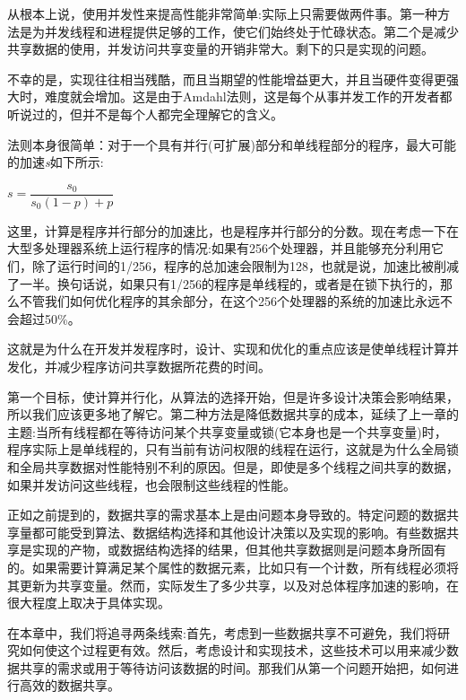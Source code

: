 从根本上说，使用并发性来提高性能非常简单:实际上只需要做两件事。第一种方法是为并发线程和进程提供足够的工作，使它们始终处于忙碌状态。第二个是减少共享数据的使用，并发访问共享变量的开销非常大。剩下的只是实现的问题。

不幸的是，实现往往相当残酷，而且当期望的性能增益更大，并且当硬件变得更强大时，难度就会增加。这是由于Amdahl法则，这是每个从事并发工作的开发者都听说过的，但并不是每个人都完全理解它的含义。

法则本身很简单：对于一个具有并行(可扩展)部分和单线程部分的程序，最大可能的加速\textit{s}如下所示:

\begin{center}
$ s = \dfrac{s_0}{s_0(1-p)+p} $
\end{center}

这里，计算是程序并行部分的加速比，也是程序并行部分的分数。现在考虑一下在大型多处理器系统上运行程序的情况:如果有256个处理器，并且能够充分利用它们，除了运行时间的1/256，程序的总加速会限制为128，也就是说，加速比被削减了一半。换句话说，如果只有1/256的程序是单线程的，或者是在锁下执行的，那么不管我们如何优化程序的其余部分，在这个256个处理器的系统的加速比永远不会超过50\%。

这就是为什么在开发并发程序时，设计、实现和优化的重点应该是使单线程计算并发化，并减少程序访问共享数据所花费的时间。

第一个目标，使计算并行化，从算法的选择开始，但是许多设计决策会影响结果，所以我们应该更多地了解它。第二种方法是降低数据共享的成本，延续了上一章的主题:当所有线程都在等待访问某个共享变量或锁(它本身也是一个共享变量)时，程序实际上是单线程的，只有当前有访问权限的线程在运行，这就是为什么全局锁和全局共享数据对性能特别不利的原因。但是，即使是多个线程之间共享的数据，如果并发访问这些线程，也会限制这些线程的性能。

正如之前提到的，数据共享的需求基本上是由问题本身导致的。特定问题的数据共享量都可能受到算法、数据结构选择和其他设计决策以及实现的影响。有些数据共享是实现的产物，或数据结构选择的结果，但其他共享数据则是问题本身所固有的。如果需要计算满足某个属性的数据元素，比如只有一个计数，所有线程必须将其更新为共享变量。然而，实际发生了多少共享，以及对总体程序加速的影响，在很大程度上取决于具体实现。

在本章中，我们将追寻两条线索:首先，考虑到一些数据共享不可避免，我们将研究如何使这个过程更有效。然后，考虑设计和实现技术，这些技术可以用来减少数据共享的需求或用于等待访问该数据的时间。那我们从第一个问题开始把，如何进行高效的数据共享。
































